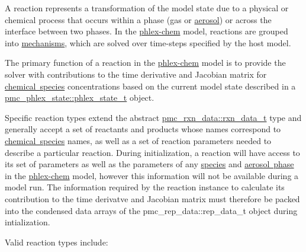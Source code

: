A reaction represents a transformation of the model state due to a physical or chemical process that occurs within a phase (gas or \mbox{\hyperlink{phlex_aero_phase}{aerosol}}) or across the interface between two phases. In the \mbox{\hyperlink{phlex_chem}{phlex-\/chem}} model, reactions are grouped into \mbox{\hyperlink{phlex_mechanism}{mechanisms}}, which are solved over time-\/steps specified by the host model.

The primary function of a reaction in the \mbox{\hyperlink{phlex_chem}{phlex-\/chem}} model is to provide the solver with contributions to the time derivative and Jacobian matrix for \mbox{\hyperlink{phlex_species}{chemical species}} concentrations based on the current model state described in a {\ttfamily \mbox{\hyperlink{structpmc__phlex__state_1_1phlex__state__t}{pmc\+\_\+phlex\+\_\+state\+::phlex\+\_\+state\+\_\+t}}} object.

Specific reaction types extend the abstract {\ttfamily \mbox{\hyperlink{structpmc__rxn__data_1_1rxn__data__t}{pmc\+\_\+rxn\+\_\+data\+::rxn\+\_\+data\+\_\+t}}} type and generally accept a set of reactants and products whose names correspond to \mbox{\hyperlink{phlex_species}{chemical species}} names, as well as a set of reaction parameters needed to describe a particular reaction. During initialization, a reaction will have access to its set of parameters as well as the parameters of any \mbox{\hyperlink{phlex_species}{species}} and \mbox{\hyperlink{phlex_aero_rep}{aerosol phase}} in the \mbox{\hyperlink{phlex_chem}{phlex-\/chem}} model, however this information will not be available during a model run. The information required by the reaction instance to calculate its contribution to the time derivatve and Jacobian matrix must therefore be packed into the condensed data arrays of the {\ttfamily pmc\+\_\+rep\+\_\+data\+::rep\+\_\+data\+\_\+t} object during intialization.

Valid reaction types include\+:


